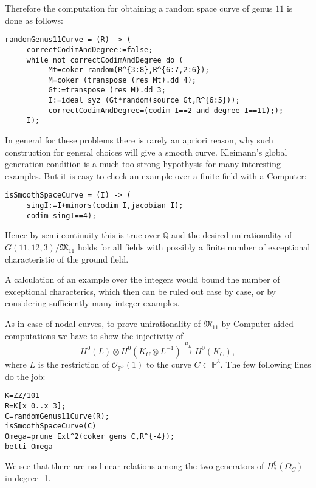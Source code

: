 \documentclass[12pt,leqno]{amsart}
\newcommand{\PP}{{\mathbb P}}
\newcommand{\QQ}{{\mathbb Q}}
\newcommand{\ko}{{\mathcal O}}
\newcommand{\lra}{\longrightarrow}
\newlength{\ho}
\newcommand{\gM}{\mathfrak M}
\begin{document}
\medskip
Therefore the computation for obtaining a random space curve of genus $11$ 
is done as follows:

{\scriptsize
\begin{verbatim}
randomGenus11Curve = (R) -> (
     correctCodimAndDegree:=false;
     while not correctCodimAndDegree do (
          Mt=coker random(R^{3:8},R^{6:7,2:6});
          M=coker (transpose (res Mt).dd_4);
          Gt:=transpose (res M).dd_3;
          I:=ideal syz (Gt*random(source Gt,R^{6:5}));
          correctCodimAndDegree=(codim I==2 and degree I==11););
     I);
\end{verbatim}}

\medskip
In general for these problems there is rarely an  apriori reason, 
why such construction for general choices will give a smooth curve. 
Kleimann's global generation condition \cite{Klei} is a much too
strong hypothysis for many interesting examples. 
But it is easy to check an example over a finite field with a Computer:

{\scriptsize
\begin{verbatim} 
isSmoothSpaceCurve = (I) -> (
     singI:=I+minors(codim I,jacobian I);
     codim singI==4);
\end{verbatim}}

Hence by semi-continuity this is true over $\QQ$ and the
desired unirationality of $G(11,12,3)/\gM_{11}$ holds for all fields 
with possibly a finite number of
exceptional characteristic of the ground field. 

A calculation of an example over the integers
would bound the number of exceptional characterics, 
which then can be ruled out case by case, 
or by considering sufficiently many integer examples.

As in case of nodal curves, to prove unirationality of $\gM_{11}$ by Computer
aided computations we have to show the injectivity of
$$
H^0(L)\otimes H^0(K_{C}\otimes L^{-1}) \stackrel{\mu_L}{\lra}H^0(K_{C}),
$$
where $L$ is the restriction of $\ko_{\PP^3}(1)$ to the curve $C\subset \PP^3$.
The few following lines do the job:
{\scriptsize
\begin{verbatim} 
K=ZZ/101
R=K[x_0..x_3];
C=randomGenus11Curve(R);
isSmoothSpaceCurve(C)
Omega=prune Ext^2(coker gens C,R^{-4});
betti Omega
\end{verbatim}}

\noindent
We see that there are no linear relations among the two generators
of $H^0_*(\Omega_C)$ in degree -1.
\end{document}

